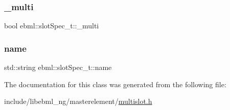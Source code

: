 \subsubsection{\texorpdfstring{\+\_\+multi}{\_multi}}
{\footnotesize\ttfamily bool ebml\+::slot\+Spec\+\_\+t\+::\+\_\+multi\hspace{0.3cm}{\ttfamily [protected]}}

\mbox{\label{classebml_1_1slotSpec__t_ab9a69de9a5c4a33b900e3e127a21b4e3}} 
\subsubsection{\texorpdfstring{name}{name}}
{\footnotesize\ttfamily std\+::string ebml\+::slot\+Spec\+\_\+t\+::name}



The documentation for this class was generated from the following file\+:\begin{DoxyCompactItemize}
\item 
include/libebml\+\_\+ng/masterelement/\mbox{\hyperlink{multislot_8h}{multislot.\+h}}\end{DoxyCompactItemize}
